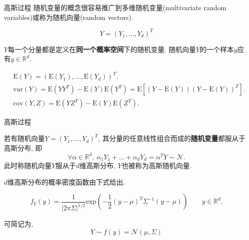 \begin{frame}[fragile]{高斯过程}
    随机变量的概念很容易推广到多维随机变量(multivariate random variables)或称为随机向量(random vectors). 

    $$Y=(Y_{1},\dots,Y_{d})^{T}$$

    $Y$每一个分量都是定义在{\bf 同一个概率空间}下的随机变量. 随机向量$Y$的一个样本$y$应有$y\in\mathds{R}^{d}$.
    
    \begin{align}
        &\mathrm{E}(Y)=(\mathrm{E}(Y_{1}),\dots,\mathrm{E}(Y_{d}))^{T}. \\
        &\mathrm{var}(Y)=\mathrm{E}(YY^{T})-\mathrm{E}(Y)\mathrm{E}(Y^{T})=\mathrm{E}[(Y-\mathrm{E}(Y))(Y-\mathrm{E}(Y))^{T}]. \\
        &\mathrm{cov}(Y, Z)=\mathrm{E}(YZ^{T})-\mathrm{E}(Y)\mathrm{E}(Z^{T}).
    \end{align}

\end{frame}

\begin{frame}[fragile]{高斯过程}
    \begin{definition}[多维高斯分布] 
        \vspace{2ex}     
        若有随机向量$Y=(Y_{1},\dots,Y_{d})^{T}$, 其分量的任意线性组合而成的{\bf 随机变量}都服从于高斯分布, 即
        \begin{equation}
            \forall\alpha\in\mathds{R}^{d},\ \alpha_{1}Y_{1}+\dots+\alpha_{d}Y_{d}=\alpha^{T}Y\sim\mathcal{N}.
        \end{equation}
        此时称随机向量$Y$服从于$d$维高斯分布, $Y$也被称为高斯随机向量.
    \end{definition}

    $d$维高斯分布的概率密度函数由下式给出.

    \begin{equation}
        f_{Y}(y)=\frac{1}{|2\pi\Sigma|^{1/2}}\mathrm{exp}\left(-\frac{1}{2}(y-\mu)^{T}\Sigma^{-1}(y-\mu)\right) \qquad y\in\mathds{R}^{d}. \label{2.6}
    \end{equation}

    可简记为,
    \begin{equation}
        Y \sim f(y)=\mathcal{N}(\mu, \Sigma)
    \end{equation}

\end{frame}

